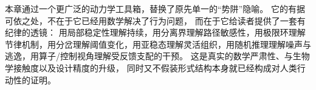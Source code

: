 \begin{summarybox}
本章通过一个更广泛的动力学工具箱，替换了原先单一的“势阱”隐喻。
它的有据可依之处，不在于它已经用数学解决了行为问题，
而在于它给读者提供了一套有纪律的透镜：
用局部稳定性理解持续，用分离界理解路径敏感性，用极限环理解节律机制，用分岔理解阈值变化，用亚稳态理解灵活组织，用随机推理理解噪声与逃逸，用算子/控制视角理解受反馈支配的干预。
这是真实的数学严肃性、与生物学接触度以及设计精度的升级，
同时又不假装形式结构本身就已经构成对人类行动性的证明。
\end{summarybox}